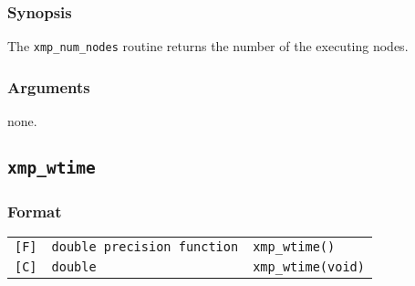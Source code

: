 \subsubsection*{Synopsis}

     The {\tt xmp\_num\_nodes} routine returns the number of the
     executing nodes.

\subsubsection*{Arguments}

none.

%
%
%
%
%
%
%
%
%

\subsection{\tt xmp\_wtime}

\subsubsection*{Format}

\begin{tabular}{lll}

\verb![F]!&  {\tt double precision function}& {\tt xmp\_wtime()}\\

\verb![C]!&  {\tt double}& {\tt xmp\_wtime(void)}

\end{tabular}

